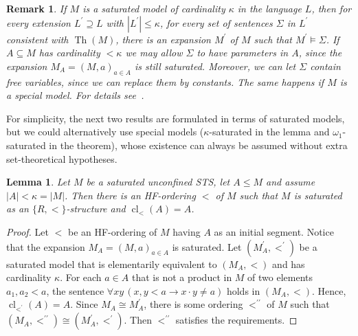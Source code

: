 \documentclass[a4paper, 11pt]{article}
\DeclareMathOperator{\cl}{cl}
\DeclareMathOperator{\Th}{Th}
\theoremstyle{note}
\newtheorem{lemma}[thm]{Lemma}
\newtheorem{rmk}[thm]{Remark}
\begin{document}
\begin{rmk}\label{May_26_2024_3} If $M$ is a saturated  model of cardinality $\kappa$ in the language $L$, then for every extension $L^\prime\supseteq L$ with $|L^\prime|\leq \kappa$, for  every set of sentences $\Sigma$ in $L^\prime$ consistent with $\Th(M)$, there is an expansion $M^\prime$ of $M$ such that $M^\prime\models \Sigma$. If $A\subseteq M$ has  cardinality $<\kappa$ we may allow $\Sigma$ to have parameters in $A$, since the expansion $M_A=(M,a)_{a\in A}$ is still saturated. Moreover, we can let $\Sigma$ contain free variables, since we can replace them by constants. The same happens if $M$ is a special model. For details see~\cite{casanovas}.
\end{rmk}

For simplicity, the next  two results are  formulated in terms of saturated models, but we could alternatively use special models ($\kappa$-saturated in the lemma and $\omega_1$-saturated in the theorem), whose existence can always be assumed without extra set-theoretical hypotheses. 

\begin{lemma}\label{May_2025}
	Let $M$ be a saturated unconfined STS, let $A\leq M$ and assume $|A|<\kappa =|M|$. Then there is an HF-ordering $<$ of $M$ such that $M$ is saturated as an $\{R,<\}$-structure and $\cl_<(A)=A$.
\end{lemma}
\begin{proof}
	Let $<$ be an HF-ordering of $M$ having $A$ as an initial segment. Notice that the expansion $M_A= (M,a)_{a\in A}$ is saturated. Let $(M^\prime_A,<^\prime)$ be a saturated model that is elementarily equivalent to $(M_A,<)$ and has cardinality $\kappa$. For each $a\in A$ that is not a product in $M$ of two elements $a_1,a_2<a$, the sentence $\forall xy \, (x,y<a\rightarrow x\cdot y \neq a)$ holds in $(M_A,<)$. Hence, $\cl_{<^\prime}(A)=A$. Since $M_A\cong M^\prime_A$, there is some ordering $<^{\prime\prime}$ of $M$ such that $(M_A,<^{\prime\prime})\cong (M^\prime_A,<^\prime)$. Then $<^{\prime\prime}$ satisfies the requirements.
\end{proof}
\end{document}
